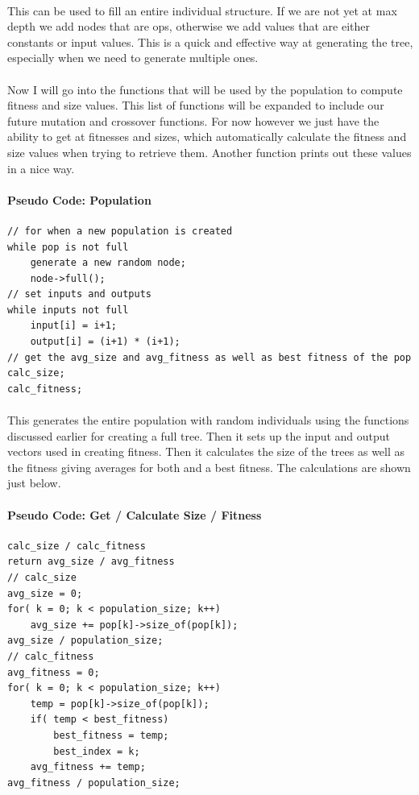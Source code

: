 \documentclass[paper=a4, fontsize=11pt]{scrartcl} %
\numberwithin{equation}{section} %
\numberwithin{figure}{section} %
\numberwithin{table}{section} %
\begin{document}
\paragraph{} This can be used to fill an entire individual structure. If we are not yet at max depth we add nodes that are ops, otherwise we add values that are either constants or input values. This is a quick and effective way at generating the tree, especially when we need to generate multiple ones.

\paragraph{} Now I will go into the functions that will be used by the population to compute fitness and size values. This list of functions will be expanded to include our future mutation and crossover functions. For now however we just have the ability to get at fitnesses and sizes, which automatically calculate the fitness and size values when trying to retrieve them. Another function prints out these values in a nice way.

\paragraph{Pseudo Code: Population}
\begin{verbatim}
// for when a new population is created
while pop is not full
    generate a new random node;
    node->full();
// set inputs and outputs
while inputs not full
    input[i] = i+1;
    output[i] = (i+1) * (i+1);
// get the avg_size and avg_fitness as well as best fitness of the pop
calc_size;
calc_fitness;
\end{verbatim}

\paragraph{} This generates the entire population with random individuals using the functions discussed earlier for creating a full tree. Then it sets up the input and output vectors used in creating fitness. Then it calculates the size of the trees as well as the fitness giving averages for both and a best fitness. The calculations are shown just below.

\paragraph{Pseudo Code: Get / Calculate Size / Fitness}
\begin{verbatim}
calc_size / calc_fitness
return avg_size / avg_fitness
// calc_size
avg_size = 0;
for( k = 0; k < population_size; k++)
    avg_size += pop[k]->size_of(pop[k]);
avg_size / population_size;
// calc_fitness
avg_fitness = 0;
for( k = 0; k < population_size; k++)
    temp = pop[k]->size_of(pop[k]);
    if( temp < best_fitness)
        best_fitness = temp;
        best_index = k;
    avg_fitness += temp;
avg_fitness / population_size;
\end{verbatim}
\end{document}
